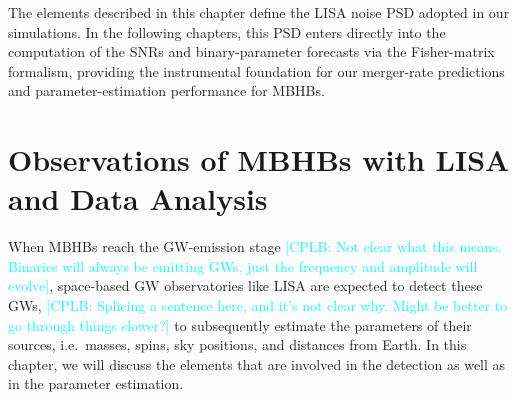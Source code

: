 \documentclass[a4paper,12pt]{article}
\newcommand{\cplb}[1]{\textcolor{cyan}{[CPLB: #1]}}
\begin{document}
The elements described in this chapter define the LISA noise PSD adopted in our simulations. In the following chapters, this PSD enters directly into the computation of the SNRs and binary-parameter forecasts via the Fisher-matrix formalism, providing the instrumental foundation for our merger-rate predictions and parameter-estimation performance for MBHBs.

\section{Observations of MBHBs with LISA and Data Analysis}
\label{sec:ObsMBHBsLISA}

When MBHBs reach the GW-emission stage \cplb{Not clear what this means. Binaries will always be emitting GWs, just the frequency and amplitude will evolve}, space-based GW observatories like LISA are expected to detect these GWs, \cplb{Splicing a sentence here, and it's not clear why. Might be better to go through things slower?} to subsequently estimate the parameters of their sources, i.e.\ masses, spins, sky positions, and distances from Earth. 
In this chapter, we will discuss the elements that are involved in the detection as well as in the parameter estimation. 
\end{document}

